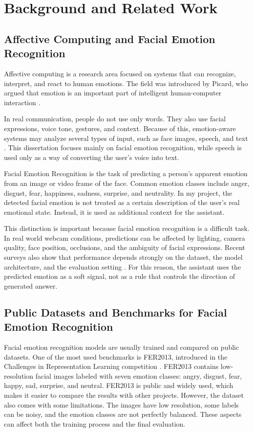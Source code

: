 \chapter{Background and Related Work}

\section{Affective Computing and Facial Emotion Recognition}

Affective computing is a research area focused on systems that can recognize, interpret, and react to human emotions. The field was introduced by Picard, who argued that emotion is an important part of intelligent human-computer interaction \cite{picard1997affective}.

In real communication, people do not use only words. They also use facial expressions, voice tone, gestures, and context. Because of this, emotion-aware systems may analyze several types of input, such as face images, speech, and text \cite{poria2017review,mobbs2025emotionreview}. This dissertation focuses mainly on facial emotion recognition, while speech is used only as a way of converting the user's voice into text.

Facial Emotion Recognition is the task of predicting a person's apparent emotion from an image or video frame of the face. Common emotion classes include anger, disgust, fear, happiness, sadness, surprise, and neutrality. In my project, the detected facial emotion is not treated as a certain description of the user's real emotional state. Instead, it is used as additional context for the assistant.

This distinction is important because facial emotion recognition is a difficult task. In real world webcam conditions, predictions can be affected by lighting, camera quality, face position, occlusions, and the ambiguity of facial expressions. Recent surveys also show that performance depends strongly on the dataset, the model architecture, and the evaluation setting \cite{mobbs2025emotionreview}. For this reason, the assistant uses the predicted emotion as a soft signal, not as a rule that controls the direction of generated answer.

\section{Public Datasets and Benchmarks for Facial Emotion Recognition}

Facial emotion recognition models are usually trained and compared on public datasets. One of the most used benchmarks is FER2013, introduced in the Challenges in Representation Learning competition \cite{goodfellow2015challenges}. FER2013 contains low-resolution facial images labeled with seven emotion classes: angry, disgust, fear, happy, sad, surprise, and neutral. FER2013 is public and widely used, which makes it easier to compare the results with other projects. However, the dataset also comes with some limitations. The images have low resolution, some labels can be noisy, and the emotion classes are not perfectly balanced. These aspects can affect both the training process and the final evaluation.

